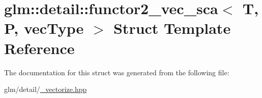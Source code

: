 \hypertarget{structglm_1_1detail_1_1functor2__vec__sca}{\section{glm\-:\-:detail\-:\-:functor2\-\_\-vec\-\_\-sca$<$ T, P, vec\-Type $>$ Struct Template Reference}
\label{structglm_1_1detail_1_1functor2__vec__sca}
}


The documentation for this struct was generated from the following file\-:\begin{DoxyCompactItemize}
\item 
glm/detail/\hyperlink{__vectorize_8hpp}{\-\_\-vectorize.\-hpp}\end{DoxyCompactItemize}
